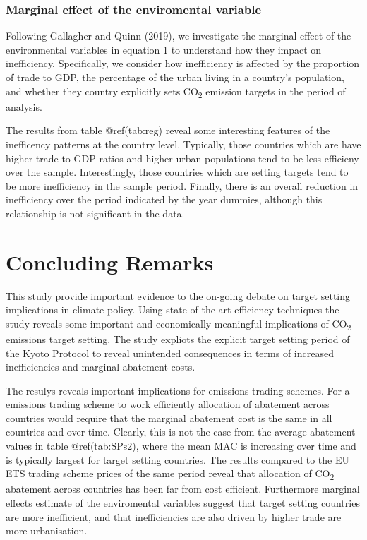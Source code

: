 \documentclass[
  10pt,
]{article}
\begin{document}
\hypertarget{marginal-effect-of-the-enviromental-variable}{%
\subsubsection{Marginal effect of the enviromental
variable}\label{marginal-effect-of-the-enviromental-variable}}

Following Gallagher and Quinn (2019), we investigate the marginal effect
of the environmental variables in equation 1 to understand how they
impact on inefficiency. Specifically, we consider how inefficiency is
affected by the proportion of trade to GDP, the percentage of the urban
living in a country's population, and whether they country explicitly
sets CO\textsubscript{2} emission targets in the period of analysis.

The results from table @ref(tab:reg) reveal some interesting features of
the inefficency patterns at the country level. Typically, those
countries which are have higher trade to GDP ratios and higher urban
populations tend to be less efficieny over the sample. Interestingly,
those countries which are setting targets tend to be more inefficiency
in the sample period. Finally, there is an overall reduction in
inefficiency over the period indicated by the year dummies, although
this relationship is not significant in the data.

\hypertarget{concluding-remarks}{%
\section{Concluding Remarks}\label{concluding-remarks}}

This study provide important evidence to the on-going debate on target
setting implications in climate policy. Using state of the art
efficiency techniques the study reveals some important and economically
meaningful implications of CO\textsubscript{2} emissions target setting.
The study expliots the explicit target setting period of the Kyoto
Protocol to reveal unintended consequences in terms of increased
inefficiencies and marginal abatement costs.

The resulys reveals important implications for emissions trading
schemes. For a emissions trading scheme to work efficiently allocation
of abatement across countries would require that the marginal abatement
cost is the same in all countries and over time. Clearly, this is not
the case from the average abatement values in table @ref(tab:SPs2),
where the mean MAC is increasing over time and is typically largest for
target setting countries. The results compared to the EU ETS trading
scheme prices of the same period reveal that allocation of
CO\textsubscript{2} abatement across countries has been far from cost
efficient. Furthermore marginal effects estimate of the enviromental
variables suggest that target setting countries are more inefficient,
and that inefficiencies are also driven by higher trade are more
urbanisation.
\end{document}
